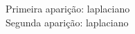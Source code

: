 \renewcommand{\listsymbolname}{\hspace*{0.35\textwidth}
\centering\large\textbf{LISTA DE SÍMBOLOS}}
\printunsrtglossary[type=symbols,style=long,title={\listsymbolname}]
\noindent
Primeira aparição: \gls{laplaciano}\\
Segunda aparição: \gls{laplaciano}
\pagebreak